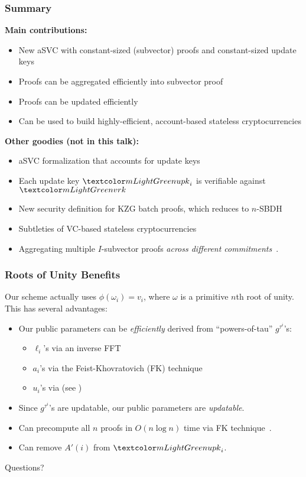 \begin{frame}
    \frametitle{Summary}

    \small
    \pause
    \textbf{Main contributions:}\pause
    \begin{itemize}
        \item New aSVC with constant-sized (subvector) proofs and constant-sized update keys\pause
        \item Proofs can be aggregated efficiently into subvector proof\pause
        \item Proofs can be updated efficiently\pause
        \item Can be used to build highly-efficient, account-based stateless cryptocurrencies\pause
    \end{itemize}

    \textbf{Other goodies (not in this talk):}\pause
    \begin{itemize}
        \item aSVC formalization that accounts for update keys\pause
        \item Each update key $\upk_i$ is verifiable against $\vrk$\pause
        \item New security definition for KZG batch proofs, which reduces to $n$-SBDH\pause
        \item Subtleties of VC-based stateless cryptocurrencies\pause
        \item Aggregating multiple $I$-subvector proofs \textit{across different commitments}~\cite{GRWZ20}.
    \end{itemize}
\end{frame}

\begin{frame}
    \frametitle{Roots of Unity Benefits}

    Our scheme actually uses $\phi(\omega_i)=v_i$, where $\omega$ is a primitive $n$th \alert{root of unity}.\pause\xspace
    This has several advantages:\pause

    \begin{itemize}
    \item Our public parameters can be \textit{efficiently} derived from ``powers-of-tau'' $g^{\tau^i}$'s:\pause
    \begin{itemize}
        \item $\ell_i$'s via an inverse FFT~\cite{Virza17}\pause
        \item $a_i$'s via the Feist-Khovratovich (FK) technique~\cite{FK20}\pause
        \item $u_i$'s via  (see \cite[Sec 3.4.5]{TAB+20})\pause
    \end{itemize}
    \item Since $g^{\tau^i}$'s are updatable, our public parameters are \textit{updatable}.\pause
    \item Can precompute all $n$ proofs in $O(n\log{n})$ time via FK technique~\cite{FK20}.\pause
    \item Can remove $A'(i)$ from $\upk_i$.
    \end{itemize}
\end{frame}

{
    \begin{frame}[standout]
        Questions?
    \end{frame}
}